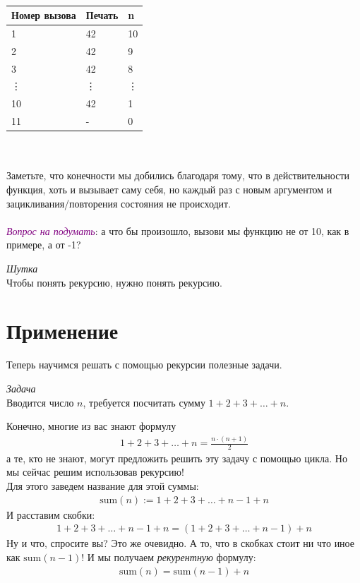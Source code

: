 \documentclass[12pt]{article} %
\begin{document}
\\
\begin{tabular}{|l|l|l|}
	\hline
	Номер вызова & Печать & n \\
	\hline
	1 & 42 & 10\\
	\hline
	2 & 42 & 9\\
	\hline
	3 & 42 & 8\\
	\hline
	\vdots & \vdots & \vdots \\
	\hline
	10 & 42 & 1 \\
	\hline
	11 & - & 0\\
	\hline
\end{tabular}\\
\\
Заметьте, что конечности мы добились благодаря тому, что в действительности функция, хоть и вызывает саму себя, но каждый раз с новым аргументом и зацикливания/повторения состояния не происходит.\\
\\
\textit{\textcolor{purple}{Вопрос на подумать}}: а что бы произошло, вызови мы функцию не от 10, как в примере, а от -1?\\
\begin{tcolorbox}[colback=white, colframe=black]
	\textit{Шутка}\\
	Чтобы понять рекурсию, нужно понять рекурсию.
\end{tcolorbox}

\section{Применение}
Теперь научимся решать с помощью рекурсии полезные задачи.\\
\begin{tcolorbox}[colback=white, colframe=black]
	\textit{Задача}\\
	Вводится число $n$, требуется посчитать сумму $1 + 2 + 3 + \ldots + n$.
\end{tcolorbox}
Конечно, многие из вас знают формулу
\begin{align*}
1 + 2 + 3 + \ldots + n = \frac{n\cdot(n + 1)}{2}
\end{align*}
а те, кто не знают, могут предложить решить эту задачу с помощью цикла. Но мы сейчас решим использовав рекурсию!\\
Для этого заведем название для этой суммы: 
\begin{align*}
\mathrm{sum}(n) := 1 + 2 + 3 + \ldots + n - 1 + n
\end{align*}
И расставим скобки: 
\begin{align*}
1 + 2 + 3 + \ldots + n - 1 + n = (1 + 2 + 3 + \ldots + n - 1) + n
\end{align*}
Ну и что, спросите вы? Это же очевидно. А то, что в скобках стоит ни что иное как $\mathrm{sum}(n - 1)$! И мы получаем \textit{рекурентную} формулу:
\begin{align}
\mathrm{sum}(n) = \mathrm{sum}(n - 1) + n
\end{align}
\end{document}
